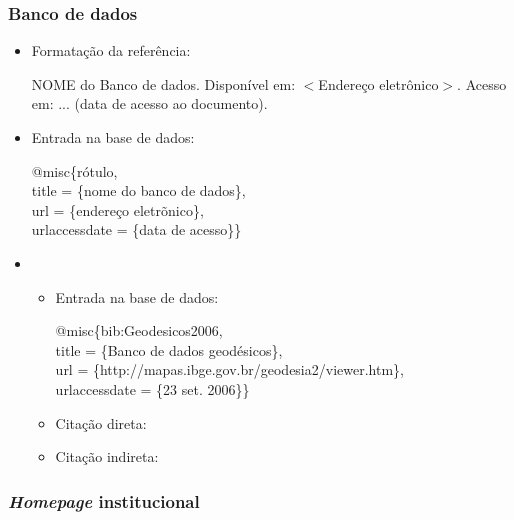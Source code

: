 \documentclass[a4paper,12pt,oneside,onecolumn]{uerj}
\newcommand{\formato}[1]{\begin{flushleft}{#1}\end{flushleft}}
\begin{document}
\subsubsection{Banco de dados}

\begin{itemize}[leftmargin=\parindent,parsep=0pt,itemsep=0pt]
  \item Formatação da referência:

  \formato{
    NOME do Banco de dados. Disponível em: $<$Endereço eletrônico$>$. Acesso em: ...
    (data de acesso ao documento).
  }

  \item Entrada na base de dados:

  \formato{
      @misc\{rótulo,\\
        title = \{nome do banco de dados\},\\
        url = \{endereço eletrõnico\},\\
        urlaccessdate = \{data de acesso\}\}\\
  }
\end{itemize}

\begin{itemize}[label={Ex.:},leftmargin=\parindent,parsep=0pt,itemsep=0pt]
  \item \formato{\citetext{bib:Geodesicos2006}}

  \begin{itemize}[leftmargin=*,parsep=0pt,itemsep=0pt]
    \item Entrada na base de dados:

    \formato{
      @misc\{bib:Geodesicos2006,\\
        title = \{Banco de dados geod{\'e}sicos\},\\
        url = \{http://mapas.ibge.gov.br/geodesia2/viewer.htm\},\\
        urlaccessdate = \{23 set. 2006\}\}\\
    }

    \item Citação direta: 
    \item Citação indireta: \cite{bib:Geodesicos2006}
  \end{itemize}
\end{itemize}

\subsubsection{\textsl{Homepage} institucional}
\end{document}
